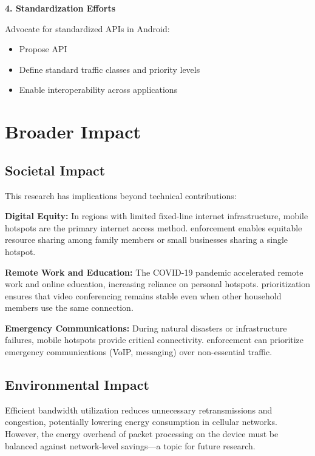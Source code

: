 \textbf{4. Standardization Efforts}

Advocate for standardized \qos APIs in Android:
\begin{itemize}
    \item Propose  API
    \item Define standard traffic classes and priority levels
    \item Enable interoperability across \qos applications
\end{itemize}

\section{Broader Impact}
\label{sec:broader-impact}

\subsection{Societal Impact}

This research has implications beyond technical contributions:

\textbf{Digital Equity:} In regions with limited fixed-line internet infrastructure, mobile hotspots are the primary internet access method. \qos enforcement enables equitable resource sharing among family members or small businesses sharing a single hotspot.

\textbf{Remote Work and Education:} The COVID-19 pandemic accelerated remote work and online education, increasing reliance on personal hotspots. \qos prioritization ensures that video conferencing remains stable even when other household members use the same connection.

\textbf{Emergency Communications:} During natural disasters or infrastructure failures, mobile hotspots provide critical connectivity. \qos enforcement can prioritize emergency communications (VoIP, messaging) over non-essential traffic.

\subsection{Environmental Impact}

Efficient bandwidth utilization reduces unnecessary retransmissions and congestion, potentially lowering energy consumption in cellular networks. However, the energy overhead of packet processing on the device must be balanced against network-level savings—a topic for future research.


